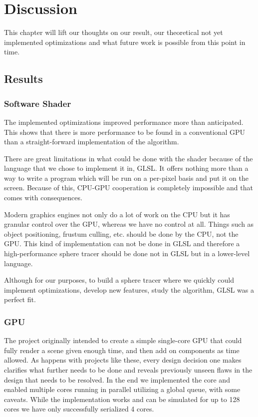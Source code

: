 \chapter{Discussion} 

	This chapter will lift our thoughts on our result, our theoretical not yet
	implemented optimizations and what future work is possible from this point
	in time.
	
	\section{Results}  \label{discussion}
		
		\subsection{Software Shader}
		
			The implemented optimizations improved performance more than
			anticipated.  This shows that there is more performance to be found
			in a conventional GPU than a straight-forward implementation of the
			algorithm. 

			There are great limitations in what could be done with the shader
			because of the language that we chose to implement it in, GLSL. It
			offers nothing more than a way to write a program which will be run
			on a per-pixel basis and put it on the screen. Because of this,
			CPU-GPU cooperation is completely impossible and that comes with
			consequences.

			Modern graphics engines not only do a lot of work on the CPU but it
			has granular control over the GPU, whereas we have no control at
			all. Things such as object positioning, frustum culling, etc.
			should be done by the CPU, not the GPU. This kind of implementation
			can not be done in GLSL and therefore a high-performance sphere
			tracer should be done not in GLSL but in a lower-level language.

			Although for our purposes, to build a sphere tracer where we
			quickly could implement optimizations, develop new features, study
			the algorithm, GLSL was a perfect fit. 

		
		\subsection{GPU} 
		
			The project originally intended to create a simple single-core GPU
			that could fully render a scene given enough time, and then add on
			components as time allowed. As happens with projects like these,
			every design decision one makes clarifies what further needs to be
			done and reveals previously unseen flaws in the design that needs
			to be resolved. In the end we implemented the core and enabled
			multiple cores running in parallel utilizing a global queue, with
			some caveats. While the implementation works and can be simulated
			for up to 128 cores we have only successfully serialized 4 cores. 
			

